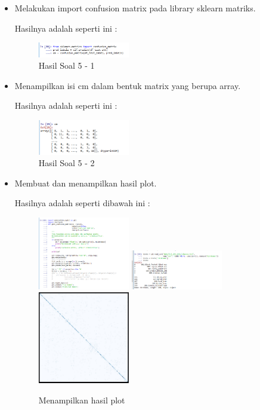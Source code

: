 \begin{enumerate}
\begin{itemize}
	\item Melakukan import confusion matrix pada library sklearn matriks.
	
	Hasilnya adalah seperti ini :

	\begin{figure}[H]
	\centering
		\includegraphics[width=4cm]{figures/1174026/3/materi/soal51.PNG}
		\caption{Hasil Soal 5 - 1}
	\end{figure}

	\item Menampilkan isi cm dalam bentuk matrix yang berupa array.
	
	Hasilnya adalah seperti ini :

	\begin{figure}[H]
	\centering
		\includegraphics[width=4cm]{figures/1174026/3/materi/soal52.PNG}
		\caption{Hasil Soal 5 - 2}
	\end{figure}

	\item Membuat dan menampilkan hasil plot.
	
	Hasilnya adalah seperti dibawah ini :
	\begin{figure}[H]
	\centering
		\includegraphics[width=4cm]{figures/1174026/3/materi/soal5_3.PNG}
		\includegraphics[width=4cm]{figures/1174026/3/materi/soal56.PNG}
		\includegraphics[width=4cm]{figures/1174026/3/materi/2.PNG}
		\caption{Menampilkan hasil plot}
	\end{figure}


\end{itemize}
\end{enumerate}
